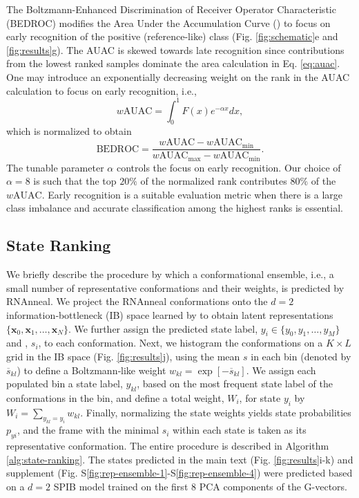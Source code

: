 \documentclass[%
aip,
 amsmath,amssymb,
reprint,%
onecolumn,
]{revtex4-1}
\makeatletter
\newcommand\setcurrentname[1]{\def\@currentlabelname{#1}}
\makeatother
\begin{document}
{The Boltzmann-Enhanced Discrimination of Receiver Operator Characteristic (BEDROC) modifies the Area Under the Accumulation Curve () to focus on early recognition of the positive (reference-like) class (Fig. \ref{fig:schematic}e and \ref{fig:results}g).\cite{truchon2007evaluating} The AUAC is skewed towards late recognition since contributions from the lowest ranked samples dominate the area calculation in Eq. \ref{eq:auac}. One may introduce an exponentially decreasing weight on the rank in the AUAC calculation to focus on early recognition, i.e.,
\begin{equation}
    \label{eq:wauac}
    w\mathrm{AUAC} = \int_0^1 F(x)e^{-\alpha x}dx,
\end{equation}
which is normalized to obtain
\begin{equation}
    \label{eq:bedroc}
    \mathrm{BEDROC} = \frac{w\mathrm{AUAC} - w\mathrm{AUAC}_{\mathrm{min}}}{w\mathrm{AUAC}_{\mathrm{max}} - w\mathrm{AUAC}_{\mathrm{min}}}.
\end{equation}
The tunable parameter $\alpha$ controls the focus on early recognition. Our choice of $\alpha=8$ is such that the top $20\%$ of the normalized rank contributes $80\%$ of the $w\mathrm{AUAC}$. Early recognition is a suitable evaluation metric when there is a large class imbalance and accurate classification among the highest ranks is essential.

\subsection*{State Ranking}
       \setcurrentname{State Ranking}
\label{methods:state-ranking}

We briefly describe the procedure by which a conformational ensemble, i.e., a small number of representative conformations and their weights, is predicted by RNAnneal. We project the RNAnneal conformations onto the $d=2$ information‑bottleneck (IB) space learned by  to obtain latent representations $\{\mathbf{x}_0,\mathbf{x}_1,\ldots,\mathbf{x}_N\}$. We further assign the predicted state label, $y_i \in \{y_0,y_1,\ldots,y_M \}$ and , $s_i$, to each conformation. Next, we histogram the conformations on a $K \times L$ grid in the IB space (Fig. \ref{fig:results}j), using the mean $s$ in each bin (denoted by $\overline{{s}}_{kl}$) to define a Boltzmann‑like weight
$w_{kl} = \exp[{-\overline{{s}}_{kl}}]$. We assign each populated bin a state label, $y_{kl}$, based on the most frequent state label of the conformations in the bin, and define a total weight, $W_i$, for state $y_i$ by $W_i = \sum_{y_{kl}=y_i} w_{kl}$. Finally, normalizing the state weights yields state probabilities $p_{yi}$, and the frame with the minimal $s_i$ within each state is taken as its representative conformation. The entire procedure is described in Algorithm \ref{alg:state-ranking}. The states predicted in the main text (Fig. \ref{fig:results}i-k) and supplement (Fig. S\ref{fig:rep-ensemble-1}-S\ref{fig:rep-ensemble-4}) were predicted based on a $d=2$ SPIB model trained on the first 8 PCA components of the G-vectors. 

}
\end{document}
